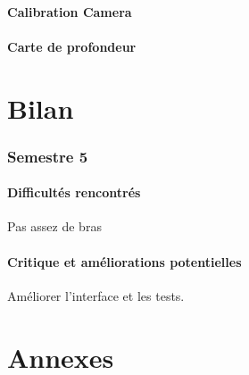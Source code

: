 \documentclass{article}
\begin{document}

\subsection{Calibration Camera}


\subsection{Carte de profondeur}


\newpage
\part{Bilan}

\section{Semestre 5}

\subsection{Difficultés rencontrés}

Pas assez de bras

\subsection{Critique et améliorations potentielles}

Améliorer l'interface et les tests.

\newpage
\appendix
\part{Annexes}
\end{document}
